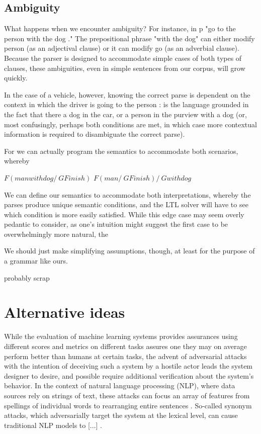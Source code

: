 \documentclass[a4paper, 11pt]{article}
\begin{document}
\subsection{Ambiguity}

What happens when we encounter ambiguity? For instance, in p "go to the person
with the dog ." The prepositional phrase "with the dog" can either modify person
(as an adjectival clause) or it can modify go (as an adverbial clause). Because
the parser is designed to accommodate simple cases of both types of clauses,
these ambiguities, even in simple sentences from our corpus, will grow quickly. 

In the case of a vehicle, however, knowing the correct parse is dependent on
the context in which the driver is going to the person : is the language
grounded in the fact that there a dog in the car, or a person in the purview
with a dog (or, most confusingly, perhaps both conditions are met, in which case
more contextual information is required to disambiguate the correct parse).

For we can actually program the semantics to accommodate both scenarios, whereby

$F (manwithdog /\ G Finish)$
$F (man /\ G Finish) /\ G withdog$

We can define our semantics to accommodate both interpretations, whereby the
parses produce unique semantic conditions, and the LTL solver will have to see
which condition is more easily satisfied. While this edge case may seem overly
pedantic to consider, as one's intuition might suggest the first case to be
overwhelmingly more natural, the

We should just make simplifying assumptions, though, at least for the purpose of
a grammar like ours.

probably scrap
\section{Alternative ideas}

While the evaluation of machine learning systems provides assurances using
different scores and metrics on different tasks assures one they may on average
perform better than humans at certain tasks, the advent of adversarial attacks
\cite{szegedy} with the intention of deceiving such a system by a hostile actor
leads the system designer to desire, and possible require additional
verification about the system's behavior. In the context of natural language
processing (NLP), where data sources rely on strings of text, these attacks can
focus an array of features from spellings of individual words to rearranging
entire sentences \cite{}. So-called synonym attacks, which adversarially target
the system at the lexical level, can cause traditional NLP models to [...]
\cite{}.
\end{document}

